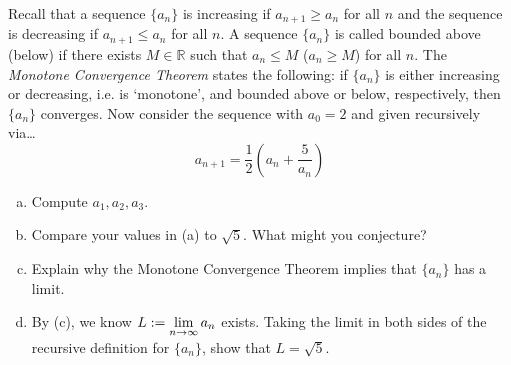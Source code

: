 \documentclass[11pt,letterpaper]{article}
\begin{document}
\newpage



 Recall that a sequence $\{ a_n \}$ is increasing if $a_{n+1} \geq a_n$ for all $n$ and the sequence is decreasing if $a_{n+1} \leq a_n$ for all $n$. A sequence $\{ a_n \}$ is called bounded above (below) if there exists $M \in \mathbb{R}$ such that $a_n \leq M$ ($a_n \geq M$) for all $n$. The \textit{Monotone Convergence Theorem} states the following: if $\{ a_n \}$ is either increasing or decreasing, i.e. is `monotone', and bounded above or below, respectively, then $\{ a_n \}$ converges. Now consider the sequence with $a_0= 2$ and given recursively via\dots
	\[
	a_{n+1}= \dfrac{1}{2} \left( a_n + \dfrac{5}{a_n} \right)
	\]

\begin{enumerate}[(a)]
\item Compute $a_1, a_2, a_3$. 
\item Compare your values in (a) to $\sqrt{5}$. What might you conjecture?
\item Explain why the Monotone Convergence Theorem implies that $\{ a_n \}$ has a limit. 
\item By (c), we know $L:= \displaystyle \lim_{n \to \infty} a_n$ exists. Taking the limit in both sides of the recursive definition for $\{ a_n \}$, show that $L= \sqrt{5}$. 
\end{enumerate} 
\end{document}
